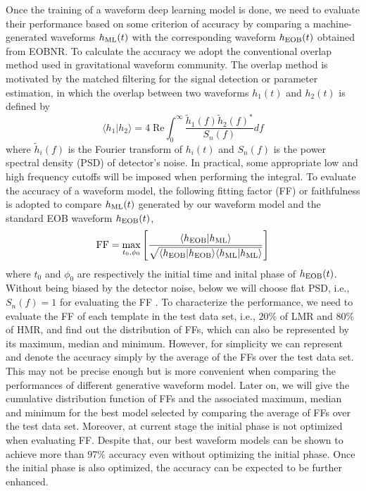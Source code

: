 \documentclass[twocolumn,prd,superscriptaddress,nofootinbib]{revtex4-1}
\def \be {\begin{equation}}
\def \ee {\end{equation}}
\def \Re {{\textrm{Re}}}
\begin{document}
Once the training of a waveform deep learning model is done, we need to evaluate their performance based on some criterion of accuracy by comparing a machine-generated waveforms $h_{\rm ML}(t)$ with the corresponding waveform $h_{\rm EOB}(t)$ obtained from EOBNR. To calculate the accuracy we adopt the conventional overlap method used in gravitational waveform community. The overlap method is motivated by the matched filtering \cite{schutz_1991,Owen_1996,Owen_1999} for the signal detection or parameter estimation, in which the overlap between two waveforms $h_1(t)$ and $h_2(t)$ is defined by
\be
\langle h_1|h_2 \rangle=4 \; \Re \int_0^{\infty} \frac{\tilde{h}_1(f) \tilde{h}_2(f)^*}{S_n(f)} df
\ee
where $\tilde{h}_i(f)$ is the Fourier transform of $h_i(t)$ and $S_n(f)$ is the power spectral density (PSD) of detector's noise. In practical, some appropriate low and high frequency cutoffs will be imposed when performing the integral. To evaluate the accuracy of a waveform model, the following fitting factor (FF) or faithfulness \cite{Babak:2006uv,Buonanno_2007,Williams_2020} is adopted to compare $h_{\rm ML}(t)$ generated by our waveform model and the standard EOB waveform $h_{\rm EOB}(t)$,
\be\label{accuracy-rate}
 \textrm{FF}= \max_{t_0,\phi_0}\left[ \frac{\langle h_{\rm EOB}|h_{\rm ML}\rangle}{\sqrt{\langle h_{\rm EOB}|h_{\rm EOB}\rangle \langle h_{\rm ML}|h_{\rm ML}\rangle}}\right]
\ee
where $t_0$ and $\phi_0$ are respectively the initial time and inital phase of $h_{\rm EOB}(t)$.  Without being biased by the detector noise, below we will choose flat PSD, i.e., $S_n(f)=1$ for evaluating the FF \cite{Williams_2020}. To characterize the performance, we need to evaluate the FF of each template in the test data set, i.e., $20\%$ of LMR and $80\%$ of HMR, and find out the distribution of FFs, which can also be represented by its maximum, median and minimum. However, for simplicity we can represent and denote the accuracy simply by the average of the FFs over the test data set. This may not be precise enough but is more convenient when comparing the performances of different generative waveform model. Later on, we will give the cumulative distribution function of FFs and the associated maximum, median and minimum for the best model selected by comparing the average of FFs over the test data set. Moreover, at current stage the initial phase is not optimized when evaluating FF. Despite that, our best waveform models can be shown to achieve more than $97\%$ accuracy even without optimizing the initial phase. Once the initial phase is also optimized, the accuracy can be expected to be further enhanced. 
\end{document}
